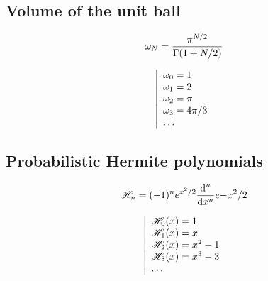 \documentclass[12pt]{article}
\begin{document}
\subsection{Volume of the unit ball}
\begin{minipage}{0.5\linewidth}
\begin{equation}\omega_N=\frac{\pi^{N/2}}{\Gamma(1+N/2)}\end{equation}
\end{minipage}
\begin{minipage}{0.5\linewidth}
\begin{equation}
  \left|
  \begin{array}{l}
    \omega_0=1 \\
    \omega_1=2 \\
    \omega_2=\pi \\
    \omega_3=4\pi/3 \\
    \dots
  \end{array}
  \right.
\end{equation}
\end{minipage}

\subsection{Probabilistic Hermite polynomials}
\begin{minipage}{0.5\linewidth}
\begin{equation}\mathscr{H}_n=(-1)^n e^{x^2/2} \frac{\text{d}^n}{\text{d}x^n}e{-x^2/2}\end{equation}
\end{minipage}
\begin{minipage}{0.5\linewidth}
\begin{equation}
  \left|
  \begin{array}{l}
    \mathscr{H}_0(x)=1 \\
    \mathscr{H}_1(x)=x \\
    \mathscr{H}_2(x)=x^2-1 \\
    \mathscr{H}_3(x)=x^3-3 \\
    \dots
  \end{array}
  \right.
\end{equation}
\end{minipage}
\end{document}
